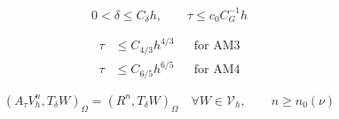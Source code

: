 \documentclass[10pt,a4paper]{amsart}
\begin{document}
\begin{equation}
0<\delta\le C_{\delta}h,\qquad
\tau\le c_0C_G^{-1}h \label{eq:cflcond}
\end{equation}

\begin{align}
\tau&\le C_{4/3}h^{4/3} &&\text{for AM3} \label{eq:am3-strengthened-cfl}\\
\tau&\le C_{6/5}h^{6/5} &&\text{for AM4} \label{eq:am4-strengthened-cfl}
\end{align}

\begin{equation}
(A_{\tau}V_h^n,T_{\delta}W)_{\Omega}
=(R^n,T_{\delta}W)_{\Omega}
\quad\forall W\in\mathcal V_h,\qquad n\ge n_0(\nu)
\label{eq:am-general-forced-equation}
\end{equation}
\end{document}
